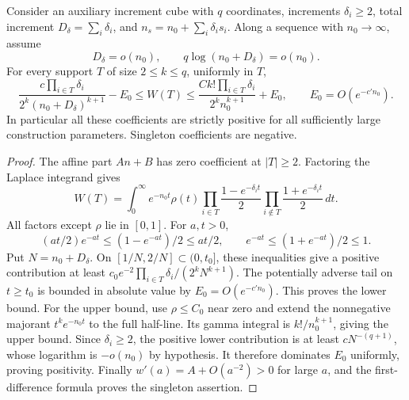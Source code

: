 \begin{lemma}\label{lem:uniform-walsh}
Consider an auxiliary increment cube with $q$ coordinates, increments
$\delta_i\ge2$, total increment $D_\delta=\sum_i\delta_i$, and
$n_s=n_0+\sum_i\delta_i s_i$. Along a sequence with $n_0\to\infty$,
assume
\[
 D_\delta=o(n_0),\qquad
 q\log(n_0+D_\delta)=o(n_0).
\]
For every support $T$ of size $2\le k\le q$, uniformly in $T$,
\begin{equation}\label{eq:uniform-walsh}
 \frac{c\prod_{i\in T}\delta_i}
      {2^k(n_0+D_\delta)^{k+1}}-E_0
 \le W(T)\le
 \frac{C k!\prod_{i\in T}\delta_i}{2^k n_0^{k+1}}+E_0,
 \qquad E_0=O(e^{-c'n_0}).
\end{equation}
In particular all these coefficients are strictly positive for all
sufficiently large construction parameters. Singleton coefficients
are negative.
\end{lemma}
\begin{proof}
The affine part $An+B$ has zero coefficient at $|T|\ge2$.
Factoring the Laplace integrand gives
\[
 W(T)=\int_0^\infty e^{-n_0t}\rho(t)
 \prod_{i\in T}\frac{1-e^{-\delta_it}}2
 \prod_{i\notin T}\frac{1+e^{-\delta_it}}2\,dt.
\]
All factors except $\rho$ lie in $[0,1]$. For $a,t>0$,
\[
 (at/2)e^{-at}\le(1-e^{-at})/2\le at/2,
 \qquad e^{-at}\le(1+e^{-at})/2\le1.
\]
Put $N=n_0+D_\delta$. On $[1/N,2/N]\subset(0,t_0]$, these
inequalities give a positive contribution at least
$c_0e^{-2}\prod_{i\in T}\delta_i/(2^kN^{k+1})$.
The potentially adverse tail on $t\ge t_0$ is bounded in absolute
value by $E_0=O(e^{-c'n_0})$. This proves the lower bound.
For the upper bound, use $\rho\le C_0$ near zero and extend the
nonnegative majorant $t^ke^{-n_0t}$ to the full half-line. Its gamma
integral is $k!/n_0^{k+1}$, giving the upper bound.
Since $\delta_i\ge2$, the positive lower contribution is at least
$cN^{-(q+1)}$, whose logarithm is $-o(n_0)$ by hypothesis.
It therefore dominates $E_0$ uniformly, proving positivity.
Finally $w'(a)=A+O(a^{-2})>0$ for large $a$, and the first-difference
formula proves the singleton assertion.
\end{proof}

